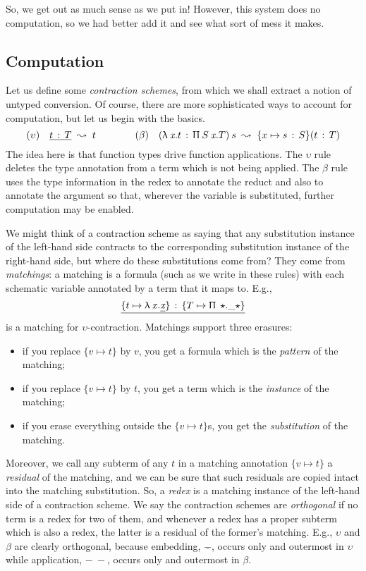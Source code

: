 \documentclass[format=acmsmall, screen, review, anonymous, timestamp]{acmart}
\newcommand{\V}[1]{\purple{\mathit{#1}}}
\newcommand{\ra}[2]{#1 \,:\, #2}
\newcommand{\Ne}{\underline}
\newcommand{\x}[1]{\V{x_{\mathrm{#1}}}}
\newcommand{\Ty}{\blue{\star}}
\begin{document}
So, we get out as much sense as we put in! However, this system does no computation, so we had better add it and see what sort of mess it makes.

  
\subsection{Computation}

\newcommand{\ma}[2]{\{#1\mapsto #2\}}

Let us define some \emph{contraction schemes}, from which we shall extract a notion of untyped conversion. Of course, there are more sophisticated ways to account for computation, but let us begin with the basics.
\[
  (\upsilon)\quad \Ne{\ra tT} \;\leadsto\; t
  \quad\quad\quad\quad 
  (\beta)\quad(\ra{\LF {\x{}}t}{\PT {S}{\x{}}T})\:s \;\leadsto\; \{x\mapsto\ra sS\}(\ra tT)
\]
The idea here is that function types drive function applications. The $\upsilon$ rule deletes the type annotation from a term which is not being applied. The $\beta$ rule uses the type information in the redex to annotate the reduct and also to annotate the argument so that, wherever the variable is substituted, further computation may be enabled.

We might think of a contraction scheme as saying that any substitution instance of the left-hand side contracts to the corresponding substitution instance of the right-hand side, but where do these substitutions come from? They come from \emph{matchings}: a matching is a formula (such as we write in these rules) with each schematic variable annotated by a term that it maps to. E.g.,
\[
  \Ne{\ra{\ma t{\LF x{\Ne{\x{}}}}}{\ma T{\PT\Ty\_\Ty}}}
\]
is a matching for $\upsilon$-contraction. Matchings support three erasures:
\begin{itemize}
\item if you replace $\ma vt$ by $v$, you get a formula which is the \emph{pattern} of the matching;
\item if you replace $\ma vt$ by $t$, you get a term which is the \emph{instance} of the matching;
\item if you erase everything outside the $\ma vt$s, you get the \emph{substitution} of the matching.
\end{itemize}
Moreover, we call any subterm of any $t$ in a matching annotation $\ma vt$ a \emph{residual} of the matching, and we can be sure that such residuals are copied intact into the matching substitution.
So, a \emph{redex} is a matching instance of the left-hand side of a contraction scheme.
We say the contraction schemes are \emph{orthogonal} if no term is a redex for two of them, and whenever a redex has a proper subterm which is also a redex, the latter is a residual of the former's matching. E.g., $\upsilon$ and $\beta$ are clearly orthogonal, because embedding, $\Ne{-}$, occurs only and outermost in $\upsilon$ while application, $-\:-$, occurs only and outermost in $\beta$.
\end{document}
